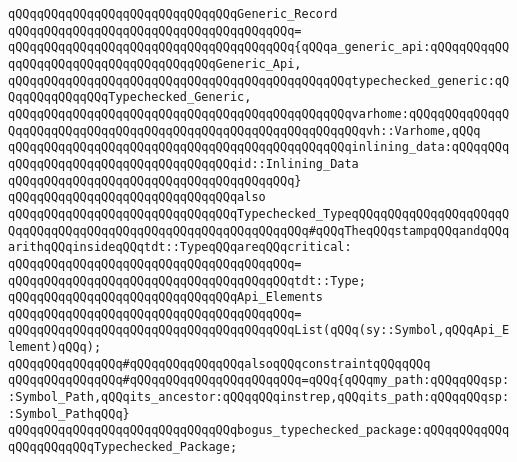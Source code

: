 \verb|qQQqqQQqqQQqqQQqqQQqqQQqqQQqqQQqGeneric_Record|\newline
\verb|qQQqqQQqqQQqqQQqqQQqqQQqqQQqqQQqqQQqqQQq=|\newline
\verb|qQQqqQQqqQQqqQQqqQQqqQQqqQQqqQQqqQQqqQQq{qQQqa_generic_api:qQQqqQQqqQQqqQQqqQQqqQQqqQQqqQQqqQQqqQQqGeneric_Api,|\newline
\verb|qQQqqQQqqQQqqQQqqQQqqQQqqQQqqQQqqQQqqQQqqQQqqQQqtypechecked_generic:qQQqqQQqqQQqqQQqTypechecked_Generic,|\newline
\verb|qQQqqQQqqQQqqQQqqQQqqQQqqQQqqQQqqQQqqQQqqQQqqQQqvarhome:qQQqqQQqqQQqqQQqqQQqqQQqqQQqqQQqqQQqqQQqqQQqqQQqqQQqqQQqqQQqqQQqvh::Varhome,qQQq|\newline
\verb|qQQqqQQqqQQqqQQqqQQqqQQqqQQqqQQqqQQqqQQqqQQqqQQqinlining_data:qQQqqQQqqQQqqQQqqQQqqQQqqQQqqQQqqQQqqQQqid::Inlining_Data|\newline
\verb|qQQqqQQqqQQqqQQqqQQqqQQqqQQqqQQqqQQqqQQq}|\newline
\newline
\newline
\verb|qQQqqQQqqQQqqQQqqQQqqQQqqQQqqQQqalso|\newline
\verb|qQQqqQQqqQQqqQQqqQQqqQQqqQQqqQQqTypechecked_TypeqQQqqQQqqQQqqQQqqQQqqQQqqQQqqQQqqQQqqQQqqQQqqQQqqQQqqQQqqQQqqQQq#qQQqTheqQQqstampqQQqandqQQqarithqQQqinsideqQQqtdt::TypeqQQqareqQQqcritical:|\newline
\verb|qQQqqQQqqQQqqQQqqQQqqQQqqQQqqQQqqQQqqQQq=|\newline
\verb|qQQqqQQqqQQqqQQqqQQqqQQqqQQqqQQqqQQqqQQqtdt::Type;|\newline
\newline
\verb|qQQqqQQqqQQqqQQqqQQqqQQqqQQqqQQqApi_Elements|\newline
\verb|qQQqqQQqqQQqqQQqqQQqqQQqqQQqqQQqqQQqqQQq=|\newline
\verb|qQQqqQQqqQQqqQQqqQQqqQQqqQQqqQQqqQQqqQQqList(qQQq(sy::Symbol,qQQqApi_Element)qQQq);|\newline
\newline
\newline
\verb|qQQqqQQqqQQqqQQq#qQQqqQQqqQQqqQQqalsoqQQqconstraintqQQqqQQq|\newline
\verb|qQQqqQQqqQQqqQQq#qQQqqQQqqQQqqQQqqQQqqQQq=qQQq{qQQqmy_path:qQQqqQQqsp::Symbol_Path,qQQqits_ancestor:qQQqqQQqinstrep,qQQqits_path:qQQqqQQqsp::Symbol_PathqQQq}|\newline
\newline
\newline
\verb|qQQqqQQqqQQqqQQqqQQqqQQqqQQqqQQqbogus_typechecked_package:qQQqqQQqqQQqqQQqqQQqqQQqTypechecked_Package;|\newline
